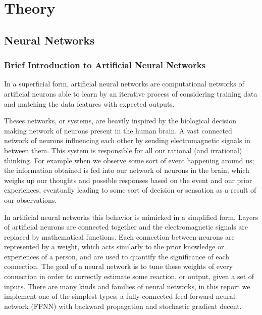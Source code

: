 \documentclass[10pt, twocolumn]{article}
\begin{document}
\section{Theory}
\label{sec:Theory}
\subsection{Neural Networks}
\label{subsec:Theory/NN}

\subsubsection{Brief Introduction to Artificial Neural Networks}
\label{subsec:Theory/ANN_intro}
In a superficial form, artificial neural networks are computational networks of artificial neurons able to learn by an iterative process of considering training data and matching the data features with expected outputs.

Theses networks, or systems, are heavily inspired by the biological decision making network of neurons present in the human brain. A vast connected network of neurons influencing each other by sending electromagnetic signals in between them. This system is responsible for all our rational (and irrational) thinking. For example when we observe some sort of event happening around us; the information obtained is fed into our network of neurons in the brain, which weighs up our thoughts and possible responses based on the event and our prior experiences, eventually leading to some sort of decision or sensation as a result of our observations.

In artificial neural networks this behavior is mimicked in a simplified form. Layers of artificial neurons are connected together and the electromagnetic signals are replaced by mathematical functions. Each connection between neurons are represented by a weight, which acts similarly to the prior knowledge or experiences of a person, and are used to quantify the significance of each connection. The goal of a neural network is to tune these weights of every connection in order to correctly estimate some reaction, or output, given a set of inputs. There are many kinds and families of neural networks, in this report we implement one of the simplest types; a fully connected feed-forward neural network (FFNN) with backward propagation and stochastic gradient decent.
\end{document}
